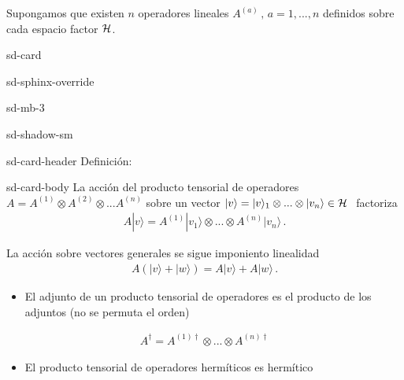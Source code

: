 \documentclass[letterpaper,10pt,english]{jupyterBook}
\newcommand{\ket}[1]{|#1\rangle}
\newcommand{\Hil}{{\cal H}}
\begin{document}
\sphinxAtStartPar
Supongamos que existen \(n\) operadores lineales \(A^{(a)}\, ,\, a=1,...,n\) definidos sobre cada espacio factor \(\Hil\).

\begin{sphinxuseclass}{sd-card}
\begin{sphinxuseclass}{sd-sphinx-override}
\begin{sphinxuseclass}{sd-mb-3}
\begin{sphinxuseclass}{sd-shadow-sm}
\begin{sphinxuseclass}{sd-card-header}
\sphinxAtStartPar
Definición:

\end{sphinxuseclass}
\begin{sphinxuseclass}{sd-card-body}
\sphinxAtStartPar
La acción del producto tensorial de operadores  \(A = A^{(1)}\otimes A^{(2)} \otimes ...A^{(n)}\) sobre un vector \(\ket{v} = \ket{v}_1\otimes ...\otimes \ket{v_n}\in \Hil~\)   factoriza
\begin{equation*}
\begin{split}
A\ket{v} = A^{(1)}\ket{v_1}\otimes ... \otimes A^{(n)} \ket{v_n}\, .
\end{split}
\end{equation*}
\end{sphinxuseclass}
\end{sphinxuseclass}
\end{sphinxuseclass}
\end{sphinxuseclass}
\end{sphinxuseclass}
\sphinxAtStartPar
La acción sobre vectores generales se sigue imponiento linealidad
\begin{equation*}
\begin{split}
A(\ket{v} + \ket{w}) = A\ket{v} + A\ket{w}\, .
\end{split}
\end{equation*}\begin{itemize}
\item {} 
\sphinxAtStartPar
El adjunto de un producto tensorial de operadores es el producto de los adjuntos (no se permuta el orden)

\end{itemize}
\begin{equation*}
\begin{split}
A^\dagger = A^{(1)\dagger} \otimes ... \otimes A^{(n)\dagger}
\end{split}
\end{equation*}\begin{itemize}
\item {} 
\sphinxAtStartPar
El producto tensorial de operadores hermíticos es hermítico

\end{itemize}
\end{document}

